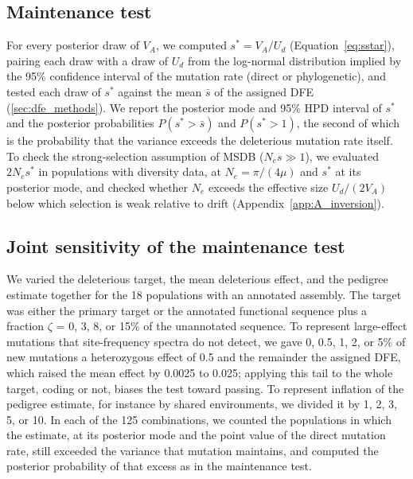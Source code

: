 \documentclass{article}
\begin{document}
\subsection{Maintenance test}\label{sec:meth_maintenance}
For every posterior draw of $V_A$, we computed $s^* = V_A/U_d$ (Equation~\eqref{eq:sstar}), pairing each draw with a draw of $U_d$ from the log-normal distribution implied by the 95\% confidence interval of the mutation rate (direct or phylogenetic), and tested each draw of $s^*$ against the mean $\bar{s}$ of the assigned DFE (\autoref{sec:dfe_methods}). We report the posterior mode and 95\% HPD interval of $s^*$ and the posterior probabilities $P(s^* > \bar{s})$ and $P(s^* > 1)$, the second of which is the probability that the variance exceeds the deleterious mutation rate itself. To check the strong-selection assumption of MSDB ($N_es \gg 1$), we evaluated $2N_es^*$ in populations with diversity data, at $N_e = \pi/(4\mu)$ and $s^*$ at its posterior mode, and checked whether $N_e$ exceeds the effective size $U_d/(2V_A)$ below which selection is weak relative to drift (Appendix~\ref{app:A_inversion}).

\subsection{Joint sensitivity of the maintenance test}\label{sec:meth_joint}
We varied the deleterious target, the mean deleterious effect, and the pedigree estimate together for the 18 populations with an annotated assembly. The target was either the primary target or the annotated functional sequence plus a fraction $\zeta$ = 0, 3, 8, or 15\% of the unannotated sequence. To represent large-effect mutations that site-frequency spectra do not detect, we gave 0, 0.5, 1, 2, or 5\% of new mutations a heterozygous effect of 0.5 and the remainder the assigned DFE, which raised the mean effect by 0.0025 to 0.025; applying this tail to the whole target, coding or not, biases the test toward passing. To represent inflation of the pedigree estimate, for instance by shared environments, we divided it by 1, 2, 3, 5, or 10. In each of the 125 combinations, we counted the populations in which the estimate, at its posterior mode and the point value of the direct mutation rate, still exceeded the variance that mutation maintains, and computed the posterior probability of that excess as in the maintenance test.
\end{document}
